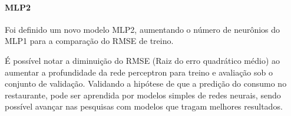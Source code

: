     	        \paragraph{MLP2}
    	        Foi definido um novo modelo MLP2, aumentando o número de neurônios do MLP1 para a comparação do RMSE de treino.
    	        \begin{figure}[H]
                \end{figure}
                \begin{figure}[H]
                \end{figure}
    	        É possível notar a diminuição do RMSE (Raiz do erro quadrático médio) ao aumentar a profundidade da rede perceptron para treino e avaliação sob o conjunto de validação. Validando a hipótese de que a predição do consumo no restaurante, pode ser aprendida por modelos simples de redes neurais, sendo possível avançar nas pesquisas com modelos que tragam melhores resultados.
